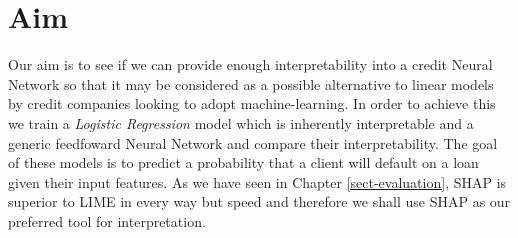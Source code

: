 \section{Aim}
 Our aim is to see if we can provide enough interpretability into a credit Neural Network so that it may be considered as a possible alternative to linear models by credit companies looking to adopt machine-learning. In order to achieve this we train a \emph{Logistic Regression} model which is inherently interpretable and a generic feedfoward Neural Network and compare their interpretability. The goal of these models is to predict a probability that a client will default on a loan given their input features. As we have seen in Chapter \ref{sect-evaluation}, SHAP is superior to LIME in every way but speed and therefore we shall use SHAP as our preferred tool for interpretation.
 
